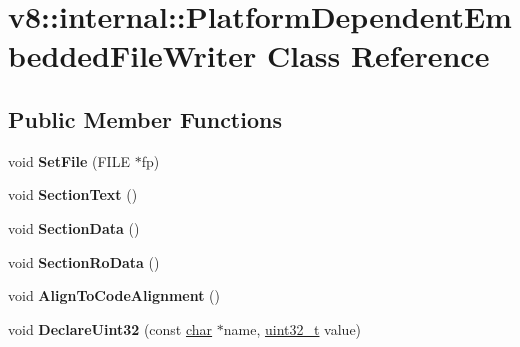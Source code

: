 \hypertarget{classv8_1_1internal_1_1PlatformDependentEmbeddedFileWriter}{}\section{v8\+:\+:internal\+:\+:Platform\+Dependent\+Embedded\+File\+Writer Class Reference}
\label{classv8_1_1internal_1_1PlatformDependentEmbeddedFileWriter}
\subsection*{Public Member Functions}
\begin{DoxyCompactItemize}
\item 
\mbox{\label{classv8_1_1internal_1_1PlatformDependentEmbeddedFileWriter_ac1eb2b371db975c184e1b6b0ec62f6e8}} 
void {\bfseries Set\+File} (F\+I\+LE $\ast$fp)
\item 
\mbox{\label{classv8_1_1internal_1_1PlatformDependentEmbeddedFileWriter_a3d6cc8eb5addaea374df394edc64c98e}} 
void {\bfseries Section\+Text} ()
\item 
\mbox{\label{classv8_1_1internal_1_1PlatformDependentEmbeddedFileWriter_ae591b5a73e5a4ce7c2471da6bdf0c33f}} 
void {\bfseries Section\+Data} ()
\item 
\mbox{\label{classv8_1_1internal_1_1PlatformDependentEmbeddedFileWriter_a43fc1f4ff971e0119b924061b3ce9be4}} 
void {\bfseries Section\+Ro\+Data} ()
\item 
\mbox{\label{classv8_1_1internal_1_1PlatformDependentEmbeddedFileWriter_af192f87918a9503b6d2b7d239d290682}} 
void {\bfseries Align\+To\+Code\+Alignment} ()
\item 
\mbox{\label{classv8_1_1internal_1_1PlatformDependentEmbeddedFileWriter_a13f5087fe921a79379668cc5541a0af7}} 
void {\bfseries Declare\+Uint32} (const \mbox{\hyperlink{classchar}{char}} $\ast$name, \mbox{\hyperlink{classuint32__t}{uint32\+\_\+t}} value)

\end{DoxyCompactItemize}
